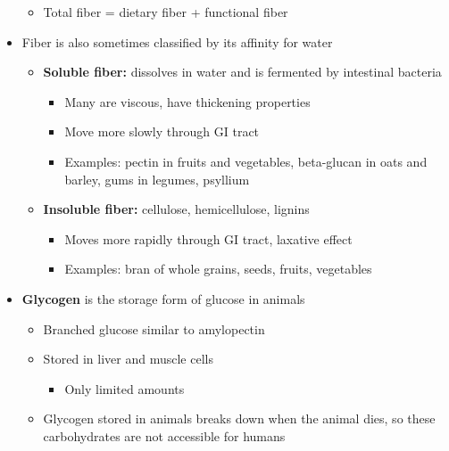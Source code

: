 \documentclass[12pt]{article}
\begin{document}
\begin{itemize}
\begin{itemize}
\begin{itemize}
                            \end{itemize}
                        \item Total fiber = dietary fiber + functional fiber
                    \end{itemize}
                \item Fiber is also sometimes classified by its affinity for water
                    \begin{itemize}
                        \item \textbf{Soluble fiber:} dissolves in water and is fermented by intestinal bacteria
                            \begin{itemize}
                                \item Many are viscous, have thickening properties
                                \item Move more slowly through GI tract
                                \item Examples: pectin in fruits and vegetables, beta-glucan in oats and barley, gums in legumes, psyllium
                            \end{itemize}
                        \item \textbf{Insoluble fiber:} cellulose, hemicellulose, lignins
                            \begin{itemize}
                                \item Moves more rapidly through GI tract, laxative effect
                                \item Examples: bran of whole grains, seeds, fruits, vegetables
                            \end{itemize}
                    \end{itemize}
                \item \textbf{Glycogen} is the storage form of glucose in animals
                    \begin{itemize}
                        \item Branched glucose similar to amylopectin
                        \item Stored in liver and muscle cells
                            \begin{itemize}
                                \item Only limited amounts
                            \end{itemize}
                        \item Glycogen stored in animals breaks down when the animal dies, so these carbohydrates are not accessible for humans
                    \end{itemize}
            \end{itemize}
\end{document}

